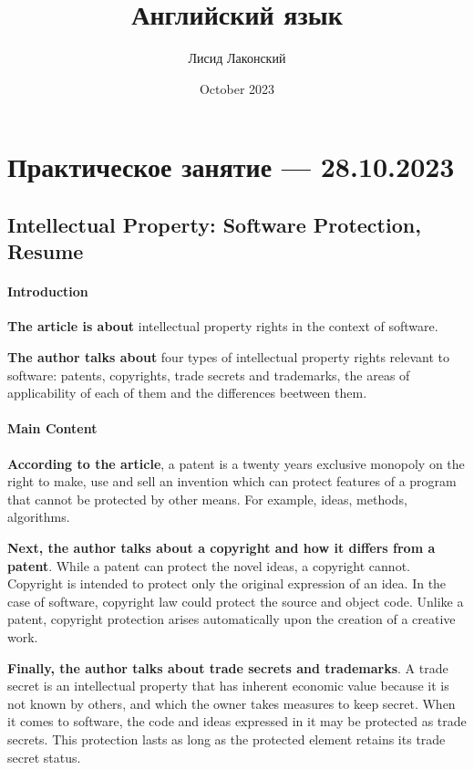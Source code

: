 \documentclass{article}
\title{Английский язык}
\author{Лисид Лаконский}
\date{October 2023}
\begin{document}
\raggedright

\maketitle

\tableofcontents
\pagebreak

\section{Практическое занятие — 28.10.2023}

\subsection{Intellectual Property: Software Protection, Resume}

\paragraph{Introduction}

\textbf{The article is about} intellectual property rights in the context of software.

\textbf{The author talks about} four types of intellectual property rights relevant to software: patents, copyrights, trade secrets and trademarks, the areas of applicability of each of them and the differences beetween them.

\paragraph{Main Content}

\textbf{According to the article}, a patent is a twenty years exclusive monopoly on the right to make, use and sell an invention which can protect features of a program that cannot be protected by other means. For example, ideas, methods, algorithms.

\textbf{Next, the author talks about a copyright and how it differs from a patent}. While a patent can protect the novel ideas, a copyright cannot. Copyright is intended to protect only the original expression of an idea. In the case of software, copyright law could protect the source and object code. Unlike a patent, copyright protection arises automatically upon the creation of a creative work.

\textbf{Finally, the author talks about trade secrets and trademarks}. A trade secret is an intellectual property that has inherent economic value because it is not known by others, and which the owner takes measures to keep secret. When it comes to software, the code and ideas expressed in it may be protected as trade secrets. This protection lasts as long as the protected element retains its trade secret status.
\end{document}
